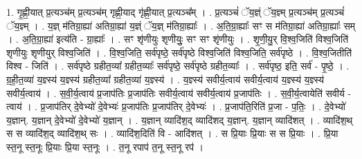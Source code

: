 \documentclass[17pt]{extarticle}
\begin{document}
1. गृ॒ह्णी॒यात् प्र॒त्यञ्च॑म् प्र॒त्यञ्च॑म् गृह्णी॒याद् गृ॑ह्णी॒यात् प्र॒त्यञ्च᳚म् । . प्र॒त्यञ्चं॑ ॅय॒ज्ञ्ं ॅय॒ज्ञ्म् प्र॒त्यञ्च॑म् प्र॒त्यञ्चं॑ ॅय॒ज्ञ्म् । . य॒ज्ञ् म॑तिग्रा॒ह्या॑ अतिग्रा॒ह्या॑ य॒ज्ञ्ं ॅय॒ज्ञ् म॑तिग्रा॒ह्याः᳚ । . अ॒ति॒ग्रा॒ह्याः᳚ सꣳ स म॑तिग्रा॒ह्या॑ अतिग्रा॒ह्याः᳚ सम् । . अ॒ति॒ग्रा॒ह्या॑ इत्य॑ति - ग्रा॒ह्याः᳚ । . सꣳ शृ॑णीयुः शृणीयुः॒ सꣳ सꣳ शृ॑णीयुः । . शृ॒णी॒यु॒र् वि॒श्व॒जिति॑ विश्व॒जिति॑ शृणीयुः शृणीयुर् विश्व॒जिति॑ । . वि॒श्व॒जिति॒ सर्व॑पृष्ठे॒ सर्व॑पृष्ठे विश्व॒जिति॑ विश्व॒जिति॒ सर्व॑पृष्ठे । . वि॒श्व॒जितीति॑ विश्व - जिति॑ । . सर्व॑पृष्ठे ग्रहीत॒व्या᳚ ग्रहीत॒व्याः᳚ सर्व॑पृष्ठे॒ सर्व॑पृष्ठे ग्रहीत॒व्याः᳚ । . सर्व॑पृष्ठ॒ इति॒ सर्व॑ - पृ॒ष्ठे॒ । . ग्र॒ही॒त॒व्या॑ य॒ज्ञ्स्य॑ य॒ज्ञ्स्य॑ ग्रहीत॒व्या᳚ ग्रहीत॒व्या॑ य॒ज्ञ्स्य॑ । . य॒ज्ञ्स्य॑ सवीर्य॒त्वाय॑ सवीर्य॒त्वाय॑ य॒ज्ञ्स्य॑ य॒ज्ञ्स्य॑ सवीर्य॒त्वाय॑ । . स॒वी॒र्य॒त्वाय॑ प्र॒जाप॑तिः प्र॒जाप॑तिः सवीर्य॒त्वाय॑ सवीर्य॒त्वाय॑ प्र॒जाप॑तिः । . स॒वी॒र्य॒त्वायेति॑ सवीर्य - त्वाय॑ । . प्र॒जाप॑तिर् दे॒वेभ्यो॑ दे॒वेभ्यः॑ प्र॒जाप॑तिः प्र॒जाप॑तिर् दे॒वेभ्यः॑ । . प्र॒जाप॑ति॒रिति॑ प्र॒जा - प॒तिः॒ । . दे॒वेभ्यो॑ य॒ज्ञान्. य॒ज्ञान् दे॒वेभ्यो॑ दे॒वेभ्यो॑ य॒ज्ञान् । . य॒ज्ञान् व्यादि॑श॒द् व्यादि॑शद् य॒ज्ञान्. य॒ज्ञान् व्यादि॑शत् । . व्यादि॑श॒थ् स स व्यादि॑श॒द् व्यादि॑श॒थ् सः । . व्यादि॑श॒दिति॑ वि - आदि॑शत् । . स प्रि॒याः प्रि॒याः स स प्रि॒याः । . प्रि॒या स्त॒नू स्त॒नूः प्रि॒याः प्रि॒या स्त॒नूः । . त॒नू रपाप॑ त॒नू स्त॒नू रप॑ । \newline
\end{document}
